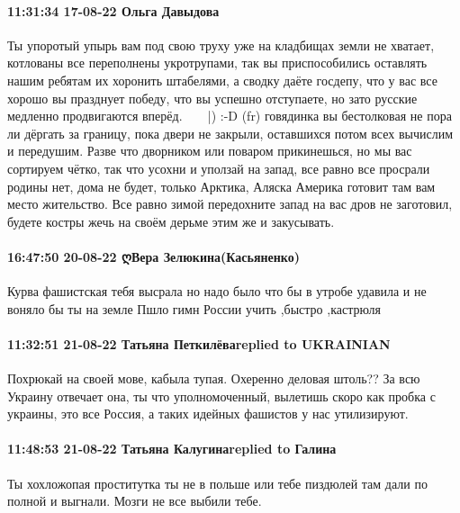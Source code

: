  
 
 
 
 

\paragraph{11:31:34 17-08-22 Ольга Давыдова}

Ты упоротый упырь вам под свою труху уже на кладбищах земли не хватает,
котлованы все переполнены укротрупами, так вы приспособились оставлять нашим
ребятам их хоронить штабелями, а сводку даёте госдепу, что у вас все хорошо вы
празднует победу, что вы успешно отступаете, но зато русские медленно
продвигаются вперёд. 🤣🤣🤣😜😜😜|) :-D (fr) говядинка вы бестолковая не пора
ли дёргать за границу, пока двери не закрыли, оставшихся потом всех вычислим и
передушим. Разве что дворником или поваром прикинешься, но мы вас сортируем
чётко, так что усохни и уползай на запад, все равно все просрали родины нет,
дома не будет, только Арктика, Аляска Америка готовит там вам место жительство.
Все равно зимой передохните запад на вас дров не заготовил, будете костры жечь
на своём дерьме этим же и закусывать.

\paragraph{16:47:50 20-08-22 ღВера Зелюкина(Касьяненко)}

Курва фашистская тебя высрала но надо было что бы в утробе удавила и не воняло
бы ты на земле Пшло гимн России учить ,быстро ,кастрюля

\paragraph{11:32:51 21-08-22 Татьяна Петкилёваreplied to UKRAINIAN}

Похрюкай на своей мове, кабыла тупая. Охеренно деловая штоль?? За всю Украину
отвечает она, ты что уполномоченный, вылетишь скоро как пробка с украины, это
все Россия, а таких идейных фашистов у нас утилизируют.

\paragraph{11:48:53 21-08-22 Татьяна Калугинаreplied to Галина}

Ты хохложопая проститутка ты не в польше или тебе пиздюлей там дали по полной и
выгнали. Мозги не все выбили тебе.


